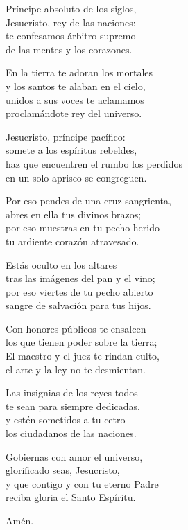 \documentclass[12pt, letterpaper]{report}
\begin{document}
    \begin{multicols}{2}
      \noindent
      Pr\'incipe absoluto de los siglos,\\
      Jesucristo, rey de las naciones:\\
      te confesamos \'arbitro supremo\\
      de las mentes y los corazones.

      \noindent
      En la tierra te adoran los mortales\\
      y los santos te alaban en el cielo,\\
      unidos a sus voces te aclamamos\\
      proclam\'andote rey del universo.

      \noindent
      Jesucristo, pr\'incipe pac\'ifico:\\
      somete a los esp\'iritus rebeldes,\\
      haz que encuentren el rumbo los perdidos\\
      en un solo aprisco se congreguen.

      \noindent
      Por eso pendes de una cruz sangrienta,\\
      abres en ella tus divinos brazos;\\
      por eso muestras en tu pecho herido\\
      tu ardiente coraz\'on atravesado.

      \noindent
      Est\'as oculto en los altares\\
      tras las im\'agenes del pan y el vino;\\
      por eso viertes de tu pecho abierto\\
      sangre de salvaci\'on para tus hijos.

      \noindent
      Con honores p\'ublicos te ensalcen\\
      los que tienen poder sobre la tierra;\\
      El maestro y el juez te rindan  culto,\\
      el arte y la ley no te desmientan.

      \noindent
      Las insignias de los reyes todos\\
      te sean para siempre dedicadas,\\
      y est\'en sometidos a tu cetro\\
      los ciudadanos de las naciones.

      \noindent
      Gobiernas con amor el universo,\\
      glorificado seas, Jesucristo,\\
      y que contigo y con tu eterno Padre\\
      reciba gloria el Santo Esp\'iritu.

      \noindent
      Am\'en.
      \clearpage
    \end{multicols}
\end{document}
